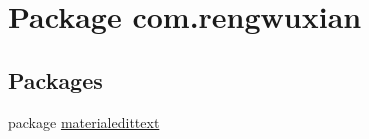 \hypertarget{namespacecom_1_1rengwuxian}{}\section{Package com.\+rengwuxian}
\label{namespacecom_1_1rengwuxian}
\subsection*{Packages}
\begin{DoxyCompactItemize}
\item 
package \hyperlink{namespacecom_1_1rengwuxian_1_1materialedittext}{materialedittext}
\end{DoxyCompactItemize}
